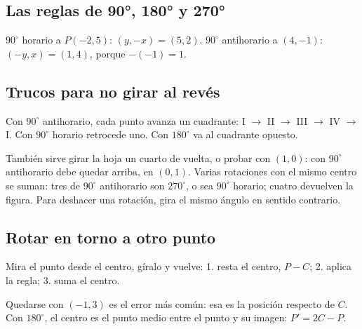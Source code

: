 \subsection{Las reglas de 90°, 180° y 270°}
\begin{ejemplo} $90^\circ$ horario a $P(-2, 5)$: $(y, -x) = (5, 2)$. $90^\circ$ antihorario a $(4, -1)$: $(-y, x) = (1, 4)$, porque $-(-1) = 1$.\end{ejemplo}

\subsection{Trucos para no girar al revés}
\begin{clave} Con $90^\circ$ antihorario, cada punto avanza un cuadrante: I $\to$ II $\to$ III $\to$ IV $\to$ I. Con $90^\circ$ horario retrocede uno. Con $180^\circ$ va al cuadrante opuesto.\end{clave}
También sirve girar la hoja un cuarto de vuelta, o probar con $(1, 0)$: con $90^\circ$ antihorario debe quedar arriba, en $(0, 1)$. Varias rotaciones con el mismo centro se suman: tres de $90^\circ$ antihorario son $270^\circ$, o sea $90^\circ$ horario; cuatro devuelven la figura. Para deshacer una rotación, gira el mismo ángulo en sentido contrario.

\subsection{Rotar en torno a otro punto}
\begin{clave}[Centro $C$] Mira el punto desde el centro, gíralo y vuelve: 1. resta el centro, $P - C$; 2. aplica la regla; 3. suma el centro.\end{clave}
\begin{ojo} Quedarse con $(-1, 3)$ es el error más común: esa es la posición respecto de $C$. Con $180^\circ$, el centro es el punto medio entre el punto y su imagen: $P' = 2C - P$.\end{ojo}

